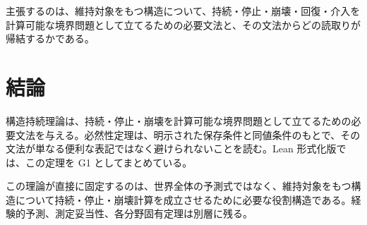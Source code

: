 \documentclass[12pt,a4paper]{article}
\begin{document}
主張するのは、維持対象をもつ構造について、持続・停止・崩壊・回復・介入を計算可能な境界問題として立てるための必要文法と、その文法からどの読取りが帰結するかである。

\section{結論}\label{ux7d50ux8ad6}

構造持続理論は、持続・停止・崩壊を計算可能な境界問題として立てるための必要文法を与える。必然性定理は、明示された保存条件と同値条件のもとで、その文法が単なる便利な表記ではなく避けられないことを読む。Lean 形式化版では、この定理を G1 としてまとめている。

この理論が直接に固定するのは、世界全体の予測式ではなく、維持対象をもつ構造について持続・停止・崩壊計算を成立させるために必要な役割構造である。経験的予測、測定妥当性、各分野固有定理は別層に残る。
\end{document}
